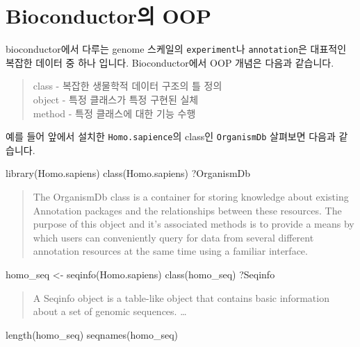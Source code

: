 \documentclass[
]{book}
\newenvironment{Shaded}{\begin{snugshade}}{\end{snugshade}}
\newcommand{\FunctionTok}[1]{\textcolor[rgb]{0.00,0.00,0.00}{#1}}
\newcommand{\NormalTok}[1]{#1}
\newcommand{\OtherTok}[1]{\textcolor[rgb]{0.56,0.35,0.01}{#1}}
\begin{document}
\hypertarget{bioconductoruxc758-oop}{%
\section{Bioconductor의 OOP}\label{bioconductoruxc758-oop}}

bioconductor에서 다루는 genome 스케일의 \texttt{experiment}나 \texttt{annotation}은 대표적인 복잡한 데이터 중 하나 입니다. Bioconductor에서 OOP 개념은 다음과 같습니다.

\begin{quote}
class - 복잡한 생물학적 데이터 구조의 틀 정의\\
object - 특정 클래스가 특정 구현된 실체\\
method - 특정 클래스에 대한 기능 수행
\end{quote}

예를 들어 앞에서 설치한 \texttt{Homo.sapience}의 class인 \texttt{OrganismDb} 살펴보면 다음과 같습니다.

\begin{Shaded}
\begin{Highlighting}[]
\FunctionTok{library}\NormalTok{(Homo.sapiens)}
\FunctionTok{class}\NormalTok{(Homo.sapiens)}
\NormalTok{?OrganismDb}
\end{Highlighting}
\end{Shaded}

\begin{quote}
The OrganismDb class is a container for storing knowledge about existing Annotation packages and the relationships between these resources. The purpose of this object and it's associated methods is to provide a means by which users can conveniently query for data from several different annotation resources at the same time using a familiar interface.
\end{quote}

\begin{Shaded}
\begin{Highlighting}[]
\NormalTok{homo\_seq }\OtherTok{\textless{}{-}} \FunctionTok{seqinfo}\NormalTok{(Homo.sapiens)}
\FunctionTok{class}\NormalTok{(homo\_seq)}
\NormalTok{?Seqinfo}
\end{Highlighting}
\end{Shaded}

\begin{quote}
A Seqinfo object is a table-like object that contains basic information about a set of genomic sequences. \ldots{}
\end{quote}

\begin{Shaded}
\begin{Highlighting}[]
\FunctionTok{length}\NormalTok{(homo\_seq)}
\FunctionTok{seqnames}\NormalTok{(homo\_seq)}
\end{Highlighting}
\end{Shaded}
\end{document}
